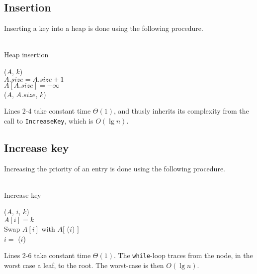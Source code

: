 \subsection{Insertion}
Inserting a key into a heap is done using the following procedure. \\\\
\label{ch:heaps|sec:procedures|sub:insertion}
\begin{algorithm}[H]
	\caption{Heap insertion}
	\label{alg:heap-insert}




	\BlankLine
	\Insert($A$, $k$) \\
	\Begin
	{
		$A.size = A.size + 1$ \\
		$A[A.size] = -\infty$ \\
		\IncreaseKey($A$, $A.size$, $k$)
	}
\end{algorithm}
Lines 2-4 take constant time $\Theta(1)$, and thusly inherits its complexity
from the call to \texttt{IncreaseKey}, which is $O(\lg n)$.

\clearpage
\subsection{Increase key}
Increasing the priority of an entry is done using the following procedure.
\\\\
\label{ch:heaps|sec:procedures|sub:increase-key}
\begin{algorithm}[H]
	\caption{Increase key}
	\label{alg:heap-increase-key}





	\BlankLine
	\IncreaseKey($A$, $i$, $k$) \\
	\Begin
	{
		$A[i] = k$ \\
		{
			Swap $A[i]$ with $A[$ \Parent($i$) $]$ \\
			$i = $ \Parent($i$)
		}
	}
\end{algorithm}
Lines 2-6 take constant time $\Theta(1)$. The \texttt{while}-loop traces from
the node, in the worst case a leaf, to the root. The worst-case is then $O(\lg n)$.

